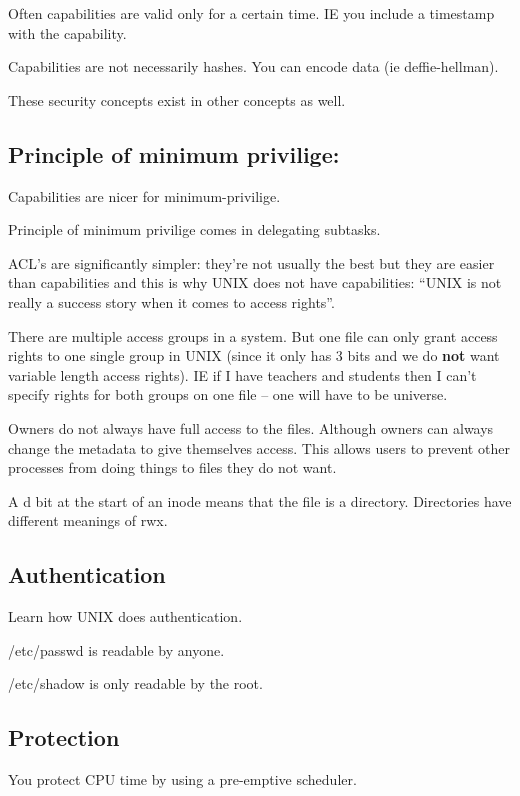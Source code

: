 \documentclass[10pt,\jkfside,a4paper]{article}
\begin{document}
Often capabilities are valid only for a certain time. IE you include a timestamp with the capability. 

Capabilities are not necessarily hashes. You can encode data (ie deffie-hellman).

These security concepts exist in other concepts as well. 

\subsection*{Principle of minimum privilige:}

Capabilities are nicer for minimum-privilige.

Principle of minimum privilige comes in delegating subtasks.

ACL's are significantly simpler: they're not usually the best but they 
are easier than capabilities and this is why UNIX does not have capabilities: 
``UNIX is not really a success story when it comes to access rights''.

There are multiple access groups in a system. But one file can only grant access rights to 
one single group in UNIX (since it only has 3 bits and we do \textbf{not} want variable length 
access rights). IE if I have teachers and students then I can't specify rights for both groups 
on one file -- one will have to be universe.

Owners do not always have full access to the files.
Although owners can always change the metadata to give themselves access. 
This allows users to prevent other processes from doing things to files they do not want. 

A d bit at the start of an inode means that the file is a directory. Directories have different 
meanings of rwx.

\subsection*{Authentication}

Learn how UNIX does authentication.

/etc/passwd is readable by anyone.

/etc/shadow is only readable by the root.

\subsection*{Protection}

You protect CPU time by using a pre-emptive scheduler.
\end{document}
